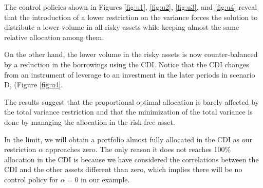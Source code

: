 The control policies shown in Figures \ref{fig:u1}, \ref{fig:u2}, \ref{fig:u3}, and \ref{fig:u4} reveal that the introduction of a lower restriction on the variance forces the solution to distribute a lower volume in all risky assets while keeping almost the same relative allocation among them.

On the other hand, the lower volume in the risky assets is now counter-balanced by a reduction in the borrowings using the CDI.
Notice that the CDI changes from an instrument of leverage to an investment in the later periods in scenario D, (Figure \ref{fig:u4}.

The results suggest that the proportional optimal allocation is barely affected by the total variance restriction and that the minimization of the total variance is done by managing the allocation in the risk-free asset.

In the limit, we will obtain a portfolio almost fully allocated in the CDI as our restriction $\alpha$ approaches zero.
The only reason it does not reaches 100\% allocation in the CDI is because we have considered the correlations between the CDI and the other assets different than zero, which implies there will be no control policy for $\alpha=0$ in our example.

